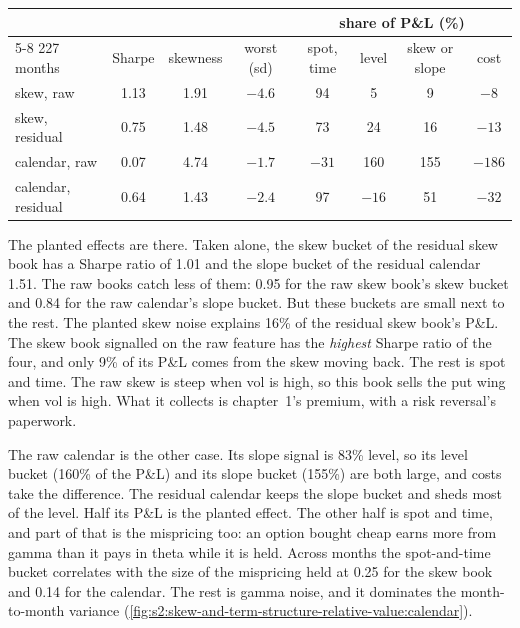 \begin{center}
\small
\begin{tabular}{@{}lccccccc@{}}
\toprule
& & & & \multicolumn{4}{c}{share of P\&L (\%)}\\
\cmidrule(l){5-8}
227 months & Sharpe & skewness & worst (sd) & spot, time & level & skew or slope & cost\\
\midrule
skew, raw & 1.13 & 1.91 & $-4.6$ & 94 & 5 & 9 & $-8$\\
skew, residual & 0.75 & 1.48 & $-4.5$ & 73 & 24 & 16 & $-13$\\
calendar, raw & 0.07 & 4.74 & $-1.7$ & $-31$ & 160 & 155 & $-186$\\
calendar, residual & 0.64 & 1.43 & $-2.4$ & 97 & $-16$ & 51 & $-32$\\
\bottomrule
\end{tabular}
\end{center}

The planted effects are there. Taken alone, the skew bucket of the residual skew book has a Sharpe ratio of 1.01 and the slope bucket of the residual
calendar 1.51. The raw books catch less of them: 0.95 for the raw skew book's skew bucket and 0.84 for the raw calendar's slope bucket. But these
buckets are small next to the rest. The planted skew noise explains 16\% of the residual skew book's P\&L. The skew book signalled on the raw feature
has the \emph{highest} Sharpe ratio of the four, and only 9\% of its P\&L comes from the skew moving back. The rest is spot and time. The raw skew is
steep when vol is high, so this book sells the put wing when vol is high. What it collects is chapter~1's premium, with a risk reversal's paperwork.

The raw calendar is the other case. Its slope signal is 83\% level, so its level bucket (160\% of the P\&L) and its slope bucket (155\%) are both
large, and costs take the difference. The residual calendar keeps the slope bucket and sheds most of the level. Half its P\&L is the planted effect.
The other half is spot and time, and part of that is the mispricing too: an option bought cheap earns more from gamma than it pays in theta while it is
held. Across months the spot-and-time bucket correlates with the size of the mispricing held at 0.25 for the skew book and 0.14 for the calendar. The
rest is gamma noise, and it dominates the month-to-month variance (\cref{fig:s2:skew-and-term-structure-relative-value:calendar}).

